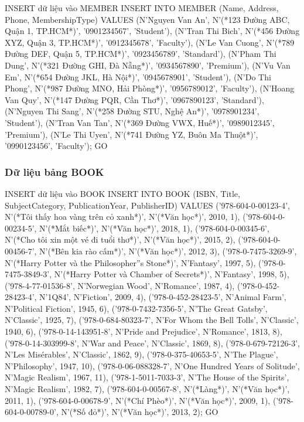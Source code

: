 \documentclass[12pt,a4paper]{article}
\begin{document}
\begin{sqlcode}{INSERT dữ liệu vào MEMBER}
INSERT INTO MEMBER (Name, Address, Phone, MembershipType) VALUES
(N'Nguyen Van An', N'(*123 Đường ABC, Quận 1, TP.HCM*)', '0901234567', 'Student'),
(N'Tran Thi Bich', N'(*456 Đường XYZ, Quận 3, TP.HCM*)', '0912345678', 'Faculty'),
(N'Le Van Cuong', N'(*789 Đường DEF, Quận 5, TP.HCM*)', '0923456789', 'Standard'),
(N'Pham Thi Dung', N'(*321 Đường GHI, Đà Nẵng*)', '0934567890', 'Premium'),
(N'Vu Van Em', N'(*654 Đường JKL, Hà Nội*)', '0945678901', 'Student'),
(N'Do Thi Phong', N'(*987 Đường MNO, Hải Phòng*)', '0956789012', 'Faculty'),
(N'Hoang Van Quy', N'(*147 Đường PQR, Cần Thơ*)', '0967890123', 'Standard'),
(N'Nguyen Thi Sang', N'(*258 Đường STU, Nghệ An*)', '0978901234', 'Student'),
(N'Tran Van Tan', N'(*369 Đường VWX, Huế*)', '0989012345', 'Premium'),
(N'Le Thi Uyen', N'(*741 Đường YZ, Buôn Ma Thuột*)', '0990123456', 'Faculty');
GO
\end{sqlcode}

\subsubsection{Dữ liệu bảng BOOK}

\begin{sqlcode}{INSERT dữ liệu vào BOOK}
INSERT INTO BOOK (ISBN, Title, SubjectCategory, PublicationYear, PublisherID) VALUES
('978-604-0-00123-4', N'(*Tôi thấy hoa vàng trên cỏ xanh*)', N'(*Văn học*)', 2010, 1),
('978-604-0-00234-5', N'(*Mắt biếc*)', N'(*Văn học*)', 2018, 1),
('978-604-0-00345-6', N'(*Cho tôi xin một vé đi tuổi thơ*)', N'(*Văn học*)', 2015, 2),
('978-604-0-00456-7', N'(*Bên kia rào cấm*)', N'(*Văn học*)', 2012, 3),
('978-0-7475-3269-9', N'(*Harry Potter và the Philosopher''s Stone*)', N'Fantasy', 1997, 5),
('978-0-7475-3849-3', N'(*Harry Potter và Chamber of Secrets*)', N'Fantasy', 1998, 5),
('978-4-77-01536-8', N'Norwegian Wood', N'Romance', 1987, 4),
('978-0-452-28423-4', N'1Q84', N'Fiction', 2009, 4),
('978-0-452-28423-5', N'Animal Farm', N'Political Fiction', 1945, 6),
('978-0-7432-7356-5', N'The Great Gatsby', N'Classic', 1925, 7),
('978-0-684-80323-7', N'For Whom the Bell Tolls', N'Classic', 1940, 6),
('978-0-14-143951-8', N'Pride and Prejudice', N'Romance', 1813, 8),
('978-0-14-303999-8', N'War and Peace', N'Classic', 1869, 8),
('978-0-679-72126-3', N'Les Misérables', N'Classic', 1862, 9),
('978-0-375-40653-5', N'The Plague', N'Philosophy', 1947, 10),
('978-0-06-088328-7', N'One Hundred Years of Solitude', N'Magic Realism', 1967, 11),
('978-1-5011-7033-3', N'The House of the Spirits', N'Magic Realism', 1982, 7),
('978-604-0-00567-8', N'(*Làng*)', N'(*Văn học*)', 2011, 1),
('978-604-0-00678-9', N'(*Chí Phèo*)', N'(*Văn học*)', 2009, 1),
('978-604-0-00789-0', N'(*Số đỏ*)', N'(*Văn học*)', 2013, 2);
GO
\end{sqlcode}
\end{document}
